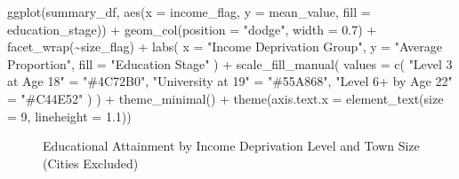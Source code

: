 \documentclass[11pt,en]{../resources/elegantpaper}
\newenvironment{Shaded}{\begin{snugshade}}{\end{snugshade}}
\newcommand{\AttributeTok}[1]{\textcolor[rgb]{0.77,0.63,0.00}{#1}}
\newcommand{\DecValTok}[1]{\textcolor[rgb]{0.00,0.00,0.81}{#1}}
\newcommand{\FloatTok}[1]{\textcolor[rgb]{0.00,0.00,0.81}{#1}}
\newcommand{\FunctionTok}[1]{\textcolor[rgb]{0.00,0.00,0.81}{#1}}
\newcommand{\NormalTok}[1]{#1}
\newcommand{\OtherTok}[1]{\textcolor[rgb]{0.50,0.00,0.50}{#1}}
\newcommand{\SpecialCharTok}[1]{\textcolor[rgb]{0.00,0.00,0.00}{#1}}
\newcommand{\StringTok}[1]{\textcolor[rgb]{0.31,0.60,0.02}{#1}}
\begin{document}
\begin{Shaded}
\begin{Highlighting}[]
\FunctionTok{ggplot}\NormalTok{(summary\_df, }\FunctionTok{aes}\NormalTok{(}\AttributeTok{x =}\NormalTok{ income\_flag, }\AttributeTok{y =}\NormalTok{ mean\_value, }\AttributeTok{fill =}\NormalTok{ education\_stage)) }\SpecialCharTok{+}
  \FunctionTok{geom\_col}\NormalTok{(}\AttributeTok{position =} \StringTok{"dodge"}\NormalTok{, }\AttributeTok{width =} \FloatTok{0.7}\NormalTok{) }\SpecialCharTok{+}
  \FunctionTok{facet\_wrap}\NormalTok{(}\SpecialCharTok{\textasciitilde{}}\NormalTok{size\_flag) }\SpecialCharTok{+}
  \FunctionTok{labs}\NormalTok{(}
    \AttributeTok{x =} \StringTok{"Income Deprivation Group"}\NormalTok{,}
    \AttributeTok{y =} \StringTok{"Average Proportion"}\NormalTok{,}
    \AttributeTok{fill =} \StringTok{"Education Stage"}
\NormalTok{  ) }\SpecialCharTok{+}
  \FunctionTok{scale\_fill\_manual}\NormalTok{(}
    \AttributeTok{values =} \FunctionTok{c}\NormalTok{(}
      \StringTok{"Level 3 at Age 18"} \OtherTok{=} \StringTok{"\#4C72B0"}\NormalTok{,}
      \StringTok{"University at 19"} \OtherTok{=} \StringTok{"\#55A868"}\NormalTok{,}
      \StringTok{"Level 6+ by Age 22"} \OtherTok{=} \StringTok{"\#C44E52"}
\NormalTok{    )}
\NormalTok{  ) }\SpecialCharTok{+}
  \FunctionTok{theme\_minimal}\NormalTok{() }\SpecialCharTok{+}
  \FunctionTok{theme}\NormalTok{(}\AttributeTok{axis.text.x =} \FunctionTok{element\_text}\NormalTok{(}\AttributeTok{size =} \DecValTok{9}\NormalTok{, }\AttributeTok{lineheight =} \FloatTok{1.1}\NormalTok{))}
\end{Highlighting}
\end{Shaded}

\begin{figure}[H]


\caption{\label{fig-income-education-by-size}Educational Attainment by
Income Deprivation Level and Town Size (Cities Excluded)}

\end{figure}%
\end{document}
